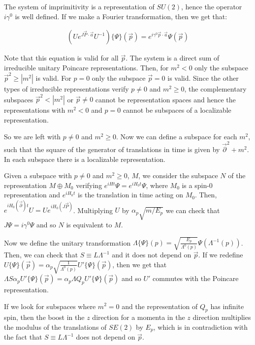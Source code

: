 \documentclass[11pt]{book}
\begin{document}
The system of imprimitivity is a representation of \(SU(2)\), hence the
operator \(i\gamma^0\) is well defined. If we make a Fourier
transformation, then we get that:

\begin{equation}\begin{aligned}
(U e^{J \vec{P}\cdot \vec{a}}U^{-1})\{\Psi\}(\vec{p})=e^{i\gamma^0 \vec{p}\cdot \vec{a}}\Psi(\vec{p})\end{aligned}\end{equation}

Note that this equation is valid for all \(\vec{p}\). The system is a
direct sum of irreducible unitary Poincare representations. Then, for
\(m^2<0\) only the subspace \(\vec{p}^2\geq |m^2|\) is valid. For
\(p=0\) only the subspace \(\vec{p}=0\) is valid. Since the other types
of irreducible representations verify \(p\neq 0\) and \(m^2\geq 0\), the
complementary subspaces \(\vec{p}^2 < |m^2|\) or \(\vec{p}\neq 0\)
cannot be representation spaces and hence the representations with
\(m^2<0\) and \(p=0\) cannot be subspaces of a localizable
representation.

So we are left with \(p\neq 0\) and \(m^2\geq 0\). Now we can define a
subspace for each \(m^2\), such that the square of the generator of
translations in time is given by \(\vec{\partial}^2+m^2\). In each
subspace there is a localizable representation.

Given a subspace with \(p\neq 0\) and \(m^2\geq 0\), \(M\), we consider
the subspace \(N\) of the representation \(M\oplus M_0\) verifying
\(e^{iH t}\Psi=e^{iH_0 t}\Psi\), where \(M_0\) is a spin-0
representation and \(e^{iH_0 t}\) is the translation in time acting on
\(M_0\). Then, \(e^{iH_0(\vec{\partial}) t}U=Ue^{iH_0(J\vec{P})}\).
Multiplying \(U\) by \(\alpha_p \sqrt{m/E_p}\) we can check that
\(J\Psi=i\gamma^0\Psi\) and so \(N\) is equivalent to \(M\).

Now we define the unitary transformation
\(\Lambda \{\Psi\}(p)=\sqrt{\frac{E_p}{\Lambda^0(p)}}\Psi(\Lambda^{-1}(p))\).
Then, we can check that \(S\equiv L\Lambda^{-1}\) and it does not depend
on \(\vec{p}\). If we redefine
\(U\{\Psi\}(\vec{p})= \alpha_p\sqrt{\frac{1}{\Lambda^0(p)}} U'\{ \Psi\}(\vec{p})\),
then we get that
\(\Lambda S \alpha_pU'\{\Psi\}(\vec{p})=\alpha_p\Lambda Q_pU'\{\Psi\}(\vec{p})\)
and so \(U'\) commutes with the Poincare representation.

If we look for subspaces where \(m^2=0\) and the representation of
\(Q_p\) has infinite spin, then the boost in the \(z\) direction for a
momenta in the \(z\) direction multiplies the modulus of the
translations of \(SE(2)\) by \(E_p\), which is in contradiction with the
fact that \(S\equiv L\Lambda^{-1}\) does not depend on \(\vec{p}\).
\end{document}
